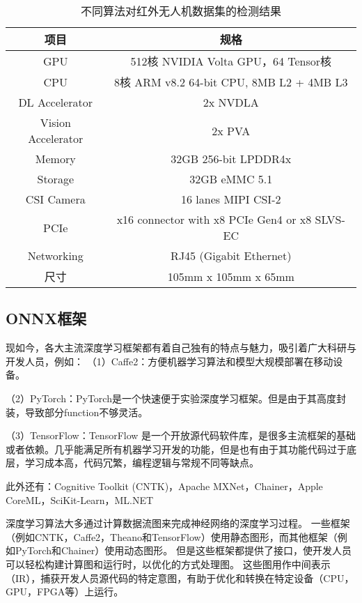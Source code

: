 \begin{table}[htbp]
    \caption{不同算法对红外无人机数据集的检测结果}
    \vspace{0.5em}\centering\wuhao
    \begin{tabular}{cc}
    \toprule
    项目 & 规格\\
    \midrule
    GPU & 512核 NVIDIA Volta GPU，64 Tensor核\\
    CPU & 8核 ARM v8.2 64-bit CPU, 8MB L2 + 4MB L3\\
    DL Accelerator & 2x NVDLA\\
    Vision Accelerator & 2x PVA\\
    Memory & 32GB 256-bit LPDDR4x\\
    Storage & 32GB eMMC 5.1\\
    CSI Camera & 16 lanes MIPI CSI-2\\
    PCIe & x16 connector with x8 PCIe Gen4 or x8 SLVS-EC\\
    Networking & RJ45 (Gigabit Ethernet)\\
    尺寸 & 105mm x 105mm x 65mm\\
    \bottomrule
    \end{tabular}
    \label{t1}
\end{table}

\subsection{ONNX框架}
现如今，各大主流深度学习框架都有着自己独有的特点与魅力，吸引着广大科研与开发人员，例如：
（1）Caffe2：方便机器学习算法和模型大规模部署在移动设备。

（2）PyTorch：PyTorch是一个快速便于实验深度学习框架。但是由于其高度封装，导致部分function不够灵活。

（3）TensorFlow：TensorFlow 是一个开放源代码软件库，是很多主流框架的基础或者依赖。几乎能满足所有机器学习开发的功能，但是也有由于其功能代码过于底层，学习成本高，代码冗繁，编程逻辑与常规不同等缺点。

此外还有：Cognitive Toolkit (CNTK)，Apache MXNet，Chainer，Apple CoreML，SciKit-Learn，ML.NET

深度学习算法大多通过计算数据流图来完成神经网络的深度学习过程。 一些框架（例如CNTK，Caffe2，Theano和TensorFlow）使用静态图形，而其他框架（例如PyTorch和Chainer）使用动态图形。 但是这些框架都提供了接口，使开发人员可以轻松构建计算图和运行时，以优化的方式处理图。 这些图用作中间表示（IR），捕获开发人员源代码的特定意图，有助于优化和转换在特定设备（CPU，GPU，FPGA等）上运行。

